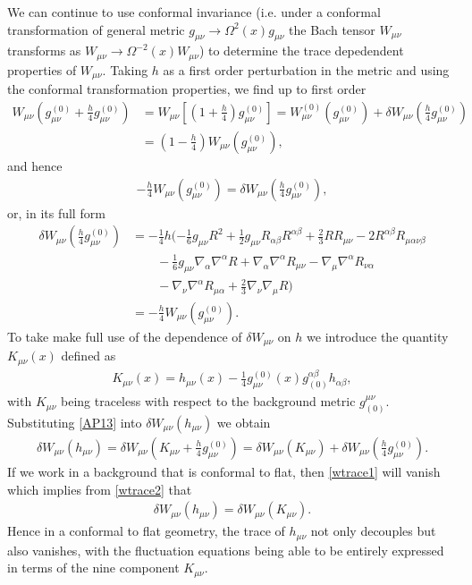 We can continue to use conformal invariance (i.e. under a conformal transformation of general metric $g_{\mu\nu}\rightarrow \Omega^2(x)g_{\mu\nu}$ the Bach tensor  $W_{\mu\nu}$ transforms as $W_{\mu\nu}\rightarrow \Omega^{-2}(x)W_{\mu\nu}$) to determine the trace depedendent properties of $W_{\mu\nu}$. Taking $h$ as a first order perturbation in the metric and using the conformal transformation properties, we find up to first order 
\begin{align}
W_{\mu\nu}\left(g^{(0)}_{\mu\nu} + \frac h4 g^{(0)}_{\mu\nu}\right) &=W_{\mu\nu}\left[\left(1+\frac h4\right)g^{(0)}_{\mu\nu} \right]= W_{\mu\nu}^{(0)}(g^{(0)}_{\mu\nu}) +\delta W_{\mu\nu}\left(\frac h4g^{(0)}_{\mu\nu}\right)\nonumber \\
&=\left(1-\frac h4\right)W_{\mu\nu}(g^{(0)}_{\mu\nu}) \nonumber,
\end{align}
and hence
\begin{eqnarray}
-\frac h4 W_{\mu\nu}(g_{\mu\nu}^{(0)}) = \delta W_{\mu\nu}\left(\frac h4 g^{(0)}_{\mu\nu}\right)\label{wtrace1},
\end{eqnarray}
or, in its full form
\begin{align}
\delta W_{\mu\nu}(\tfrac{h}{4}g^{(0)}_{\mu\nu}) &= - \tfrac{1}{4} h (- \tfrac{1}{6} g_{\mu \nu} R^2 + \tfrac{1}{2} g_{\mu \nu} R_{\alpha \beta} R^{\alpha \beta} + \tfrac{2}{3} R R_{\mu \nu} - 2 R^{\alpha \beta} R_{\mu \alpha \nu \beta}  \nonumber\\
&\qquad- \tfrac{1}{6} g_{\mu \nu} \nabla_{\alpha}\nabla^{\alpha}R + \nabla_{\alpha}\nabla^{\alpha}R_{\mu \nu} -  \nabla_{\mu}\nabla^{\alpha}R_{\nu \alpha} 
\nonumber\\
&\qquad-  \nabla_{\nu}\nabla^{\alpha}R_{\mu \alpha} + \tfrac{2}{3} \nabla_{\nu}\nabla_{\mu}R)  
\nonumber\\
&= -\tfrac{h}{4}W_{\mu\nu}(g^{(0)}_{\mu\nu}). 
\label{dwtrace1}
\end{align}
To take make full use of the dependence of $\delta W_{\mu\nu}$ on $h$ we introduce the quantity $K_{\mu\nu}(x)$ defined as 
%
\begin{eqnarray}
K_{\mu\nu}(x)=h_{\mu\nu}(x)-\frac{1}{4}g^{(0)}_{\mu\nu}(x)g_{(0)}^{\alpha\beta}h_{\alpha\beta},
\label{AP13}
\end{eqnarray}
%
with $K_{\mu\nu}$ being traceless with respect to the background metric $g_{(0)}^{\mu\nu}$.
Substituting \eqref{AP13} into $\delta W_{\mu\nu}(h_{\mu\nu})$ we obtain
\begin{eqnarray}
\delta W_{\mu\nu}(h_{\mu\nu}) = \delta W_{\mu\nu}\left(K_{\mu\nu}+\frac h4g^{(0)}_{\mu\nu}\right)= \delta W_{\mu\nu}(K_{\mu\nu}) +\delta W_{\mu\nu}\left(\frac h4g^{(0)}_{\mu\nu}\right)\label{wtrace2}.
\end{eqnarray}
If we work in a background that is conformal to flat, then \eqref{wtrace1} will vanish which implies from \eqref{wtrace2} that
\begin{eqnarray}
\delta W_{\mu\nu}(h_{\mu\nu}) = \delta W_{\mu\nu}(K_{\mu\nu}).
\end{eqnarray}
Hence in a conformal to flat geometry, the trace of $h_{\mu\nu}$ not only decouples but also vanishes, with the fluctuation equations being able to be entirely expressed in terms of the nine component $K_{\mu\nu}$.

